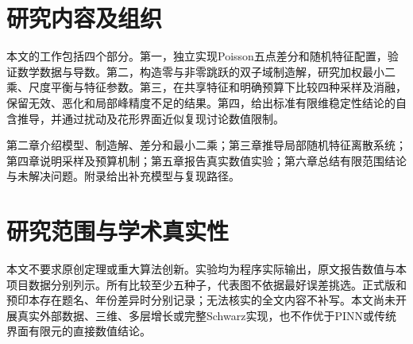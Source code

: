 \section{研究内容及组织}
本文的工作包括四个部分。第一，独立实现Poisson五点差分和随机特征配置，验证数学数据与导数。第二，构造零与非零跳跃的双子域制造解，研究加权最小二乘、尺度平衡与特征参数。第三，在共享特征和明确预算下比较四种采样及消融，保留无效、恶化和局部峰精度不足的结果。第四，给出标准有限维稳定性结论的自含推导，并通过扰动及花形界面近似复现讨论数值限制。

第二章介绍模型、制造解、差分和最小二乘；第三章推导局部随机特征离散系统；第四章说明采样及预算机制；第五章报告真实数值实验；第六章总结有限范围结论与未解决问题。附录给出补充模型与复现路径。

\section{研究范围与学术真实性}
本文不要求原创定理或重大算法创新。实验均为程序实际输出，原文报告数值与本项目数据分别列示。所有比较至少五种子，代表图不依据最好误差挑选。正式版和预印本存在题名、年份差异时分别记录；无法核实的全文内容不补写。本文尚未开展真实外部数据、三维、多层增长或完整Schwarz实现，也不作优于PINN或传统界面有限元的直接数值结论。
